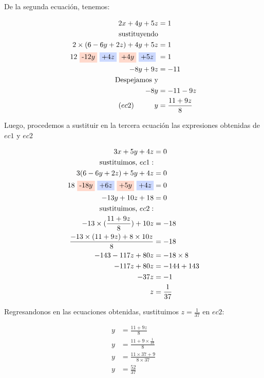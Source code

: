     De la segunda ecuación, tenemos:

    \begin{align*}
        2x+4y+5z &= 1	\\
        \text{sustituyendo}\\
        2\times(6-6y+2z)+4y+5z &= 1\\
        \text{12 \colorbox{RojoClaro}{-12$y$} \colorbox{AzulClaro}{+4$z$} \colorbox{RojoClaro}{+4$y$} \colorbox{AzulClaro}{+5$z$} }&= \text{1}\\
        -8y + 9z &= -11\\
        \text{Despejamos y} \\
        -8y&= -11-9z \\
        (ec2)\hspace*{1cm} y &= \frac{11+9z}{8}\\
    \end{align*}

    Luego, procedemos a sustituir en la tercera ecuación las expresiones obtenidas
    de $ ec1 $  y $ ec2 $

    \begin{align*}
        3x + 5y + 4z &= 0   \\
        \text{sustituimos, }ec1:\\
        3(6-6y+2z) +5y + 4z &= 0 \\
        \text{18 \colorbox{RojoClaro}{-18$y$} \colorbox{AzulClaro}{+6$z$} \colorbox{RojoClaro}{+5$y$} \colorbox{AzulClaro}{+4$z$}} &= 0\\
        -13y+10z+18&=0\\
        \text{sustituimos, }ec2:\\
        -13\times(\frac{11+9z}{8})+10z &= -18\\
        \frac{-13\times(11+9z)+ 8\times10z}{8}&=-18\\
        -143-117z+80z &=-18\times8\\
        -117z+80z&=-144+143\\
        -37z&=-1\\
        z&=\frac{1}{37}
    \end{align*}

    Regresandonos en las ecuaciones obtenidas, sustituimos
    $\displaystyle z= \frac{1}{37}$  en $ ec2 $:

    \begin{align*}
        y &=\frac{11+9z}{8}  		\\
        y &= \frac{11+9\times\frac{1}{37} }{8}\\
        y &= \frac{11\times37+9}{8\times37} \\
        y&= \frac{52}{37} \\
    \end{align*}

